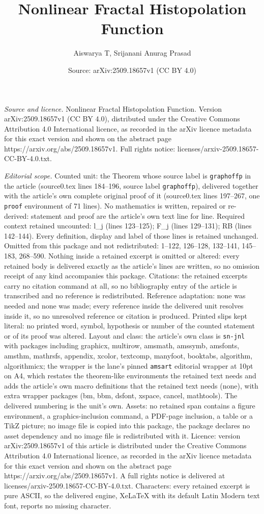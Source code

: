 \documentclass[10pt,a4paper]{amsart}
\title[Nonlinear Fractal Histopolation Function]{Nonlinear Fractal Histopolation Function}
\author{Aiswarya T, Srijanani Anurag Prasad}
\date{Source: arXiv:2509.18657v1 (CC BY 4.0)}
\begin{document}
\maketitle

\noindent\emph{Source and licence.} Nonlinear Fractal Histopolation Function. Version arXiv:2509.18657v1 (CC BY 4.0), distributed under the Creative Commons Attribution 4.0 International licence, as recorded in the arXiv licence metadata for this exact version and shown on the abstract page https://arxiv.org/abs/2509.18657v1. Full rights notice: licenses/arxiv-2509.18657-CC-BY-4.0.txt.\par\smallskip

\noindent\textit{Editorial scope.} Counted unit: the Theorem whose source label is \texttt{graphoffp} in the article (source0.tex lines 184--196, source label \texttt{graphoffp}), delivered together with the article's own complete original proof of it (source0.tex lines 197--267, one \texttt{proof} environment of 71 lines). No mathematics is written, repaired or re-derived: statement and proof are the article's own text line for line. Required context retained uncounted: l\_j (lines 123--125); F\_j (lines 129--131); RB (lines 142--144). Every definition, display and label of those lines is retained unchanged. Omitted from this package and not redistributed: 1--122, 126--128, 132--141, 145--183, 268--590. Nothing inside a retained excerpt is omitted or altered: every retained body is delivered exactly as the article's lines are written, so no omission receipt of any kind accompanies this package. Citations: the retained excerpts carry no citation command at all, so no bibliography entry of the article is transcribed and no reference is redistributed. Reference adaptation: none was needed and none was made; every reference inside the delivered unit resolves inside it, so no unresolved reference or citation is produced. Printed slips kept literal: no printed word, symbol, hypothesis or number of the counted statement or of its proof was altered. Layout and class: the article's own class is \texttt{sn-jnl} with packages including graphicx, multirow, amsmath, amssymb, amsfonts, amsthm, mathrsfs, appendix, xcolor, textcomp, manyfoot, booktabs, algorithm, algorithmicx; the wrapper is the lane's pinned \texttt{amsart} editorial wrapper at 10pt on A4, which restates the theorem-like environments the retained text needs and adds the article's own macro definitions that the retained text needs (none), with extra wrapper packages (bm, bbm, dsfont, xspace, cancel, mathtools). The delivered numbering is the unit's own. Assets: no retained span contains a figure environment, a graphics-inclusion command, a PDF-page inclusion, a table or a TikZ picture; no image file is copied into this package, the package declares no asset dependency and no image file is redistributed with it. Licence: version arXiv:2509.18657v1 of this article is distributed under the Creative Commons Attribution 4.0 International licence, as recorded in the arXiv licence metadata for this exact version and shown on the abstract page https://arxiv.org/abs/2509.18657v1. A full rights notice is delivered at licenses/arxiv-2509.18657-CC-BY-4.0.txt. Characters: every retained excerpt is pure ASCII, so the delivered engine, XeLaTeX with its default Latin Modern text font, reports no missing character.
\end{document}
